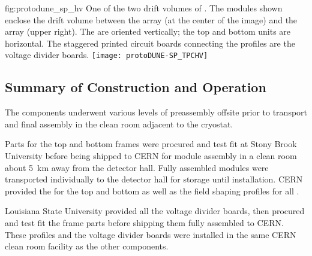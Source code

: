 \begin{dunefigure}
{fig:protodune_sp_hv}
{One of the two drift volumes of . The  modules shown enclose the drift volume between the  array (at the center of the image) and the  array (upper right). The  are oriented vertically; the top and bottom units are horizontal. The staggered printed circuit boards connecting the  profiles are the voltage divider boards. %
}
\texttt{[image: protoDUNE-SP\_TPCHV]}
\end{dunefigure}

\subsection{Summary of Construction and Operation}
\label{sec:fdsp-hv-protodune-summary}

The   components underwent %
various levels of preassembly offsite prior to transport and final assembly in the  clean room adjacent to the cryostat.

Parts for the top and bottom  frames were procured and test fit at Stony Brook University before being shipped to CERN for module assembly in a clean room about \SI{5}{km} away from the detector hall.
Fully assembled modules were transported individually to the detector hall for storage until installation. CERN provided the  for the top and bottom  as well as the field shaping profiles for all .


Louisiana State University provided all the voltage divider boards, then procured and test fit the  frame parts before shipping them fully assembled to CERN.
These profiles and the voltage divider boards were installed in the same CERN clean room facility as the other  components.

